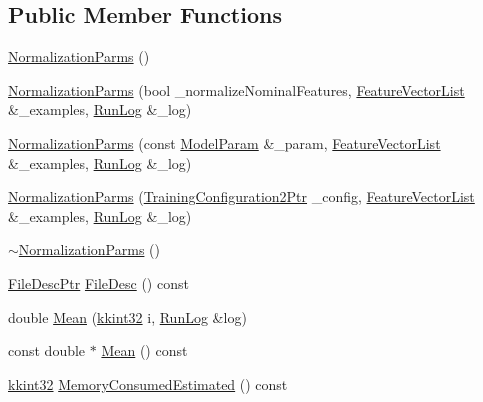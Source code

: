 \subsection*{Public Member Functions}
\begin{DoxyCompactItemize}
\item 
\hyperlink{class_k_k_m_l_l_1_1_normalization_parms_a44c91311d5522c5c1ad7456a56dabbc8}{Normalization\+Parms} ()
\item 
\hyperlink{class_k_k_m_l_l_1_1_normalization_parms_a1496655d2d2e2e468bb57be6b646c1ac}{Normalization\+Parms} (bool \+\_\+normalize\+Nominal\+Features, \hyperlink{class_k_k_m_l_l_1_1_feature_vector_list}{Feature\+Vector\+List} \&\+\_\+examples, \hyperlink{class_k_k_b_1_1_run_log}{Run\+Log} \&\+\_\+log)
\item 
\hyperlink{class_k_k_m_l_l_1_1_normalization_parms_a1206bfce24715181c8fd903ec87754dc}{Normalization\+Parms} (const \hyperlink{class_k_k_m_l_l_1_1_model_param}{Model\+Param} \&\+\_\+param, \hyperlink{class_k_k_m_l_l_1_1_feature_vector_list}{Feature\+Vector\+List} \&\+\_\+examples, \hyperlink{class_k_k_b_1_1_run_log}{Run\+Log} \&\+\_\+log)
\item 
\hyperlink{class_k_k_m_l_l_1_1_normalization_parms_a9d326ee4f7d7ba7461514a05b6a903a9}{Normalization\+Parms} (\hyperlink{namespace_k_k_m_l_l_a5da4b334417f8c9e4e2fd5924da7fe62}{Training\+Configuration2\+Ptr} \+\_\+config, \hyperlink{class_k_k_m_l_l_1_1_feature_vector_list}{Feature\+Vector\+List} \&\+\_\+examples, \hyperlink{class_k_k_b_1_1_run_log}{Run\+Log} \&\+\_\+log)
\item 
\hyperlink{class_k_k_m_l_l_1_1_normalization_parms_a6b68a67df0931bf5bc798d348c28d3f4}{$\sim$\+Normalization\+Parms} ()
\item 
\hyperlink{namespace_k_k_m_l_l_aa0d0b6ab4ec18868a399b8455b05d914}{File\+Desc\+Ptr} \hyperlink{class_k_k_m_l_l_1_1_normalization_parms_a7937aa95143a2799893a1493b227d044}{File\+Desc} () const 
\item 
double \hyperlink{class_k_k_m_l_l_1_1_normalization_parms_a1ceb1d4ea3dc3c944ba676ca69341d82}{Mean} (\hyperlink{namespace_k_k_b_a8fa4952cc84fda1de4bec1fbdd8d5b1b}{kkint32} i, \hyperlink{class_k_k_b_1_1_run_log}{Run\+Log} \&log)
\item 
const double $\ast$ \hyperlink{class_k_k_m_l_l_1_1_normalization_parms_ae52c27bf9d44b59dc50bb57797100c87}{Mean} () const 
\item 
\hyperlink{namespace_k_k_b_a8fa4952cc84fda1de4bec1fbdd8d5b1b}{kkint32} \hyperlink{class_k_k_m_l_l_1_1_normalization_parms_a32dec15a2a7ecd1a53557063e23ae689}{Memory\+Consumed\+Estimated} () const 

\end{DoxyCompactItemize}
